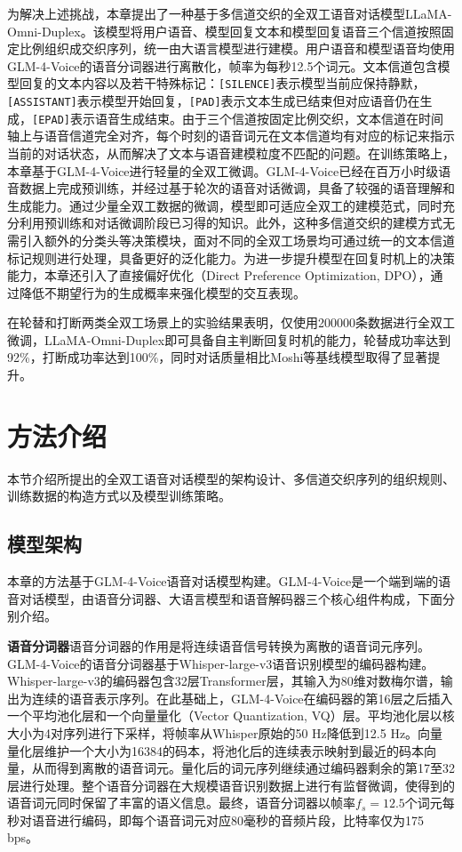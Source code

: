 为解决上述挑战，本章提出了一种基于多信道交织的全双工语音对话模型LLaMA-Omni-Duplex。该模型将用户语音、模型回复文本和模型回复语音三个信道按照固定比例组织成交织序列，统一由大语言模型进行建模。用户语音和模型语音均使用GLM-4-Voice\citep{glm4voice}的语音分词器进行离散化，帧率为每秒12.5个词元。文本信道包含模型回复的文本内容以及若干特殊标记：\texttt{[SILENCE]}表示模型当前应保持静默，\texttt{[ASSISTANT]}表示模型开始回复，\texttt{[PAD]}表示文本生成已结束但对应语音仍在生成，\texttt{[EPAD]}表示语音生成结束。由于三个信道按固定比例交织，文本信道在时间轴上与语音信道完全对齐，每个时刻的语音词元在文本信道均有对应的标记来指示当前的对话状态，从而解决了文本与语音建模粒度不匹配的问题。在训练策略上，本章基于GLM-4-Voice进行轻量的全双工微调。GLM-4-Voice已经在百万小时级语音数据上完成预训练，并经过基于轮次的语音对话微调，具备了较强的语音理解和生成能力。通过少量全双工数据的微调，模型即可适应全双工的建模范式，同时充分利用预训练和对话微调阶段已习得的知识。此外，这种多信道交织的建模方式无需引入额外的分类头等决策模块，面对不同的全双工场景均可通过统一的文本信道标记规则进行处理，具备更好的泛化能力。为进一步提升模型在回复时机上的决策能力，本章还引入了直接偏好优化（Direct Preference Optimization, DPO）\citep{rafailov2023dpo}，通过降低不期望行为的生成概率来强化模型的交互表现。

在轮替和打断两类全双工场景上的实验结果表明，仅使用200000条数据进行全双工微调，LLaMA-Omni-Duplex即可具备自主判断回复时机的能力，轮替成功率达到92\%，打断成功率达到100\%，同时对话质量相比Moshi\citep{kyutai2024moshi}等基线模型取得了显著提升。


\section{方法介绍}

本节介绍所提出的全双工语音对话模型的架构设计、多信道交织序列的组织规则、训练数据的构造方式以及模型训练策略。

\subsection{模型架构}

本章的方法基于GLM-4-Voice\citep{glm4voice}语音对话模型构建。GLM-4-Voice是一个端到端的语音对话模型，由语音分词器、大语言模型和语音解码器三个核心组件构成，下面分别介绍。

\textbf{语音分词器}\quad 语音分词器的作用是将连续语音信号转换为离散的语音词元序列。GLM-4-Voice的语音分词器基于Whisper-large-v3\citep{whisper}语音识别模型的编码器构建。Whisper-large-v3的编码器包含32层Transformer层，其输入为80维对数梅尔谱，输出为连续的语音表示序列。在此基础上，GLM-4-Voice在编码器的第16层之后插入一个平均池化层和一个向量量化（Vector Quantization, VQ）层。平均池化层以核大小为4对序列进行下采样，将帧率从Whisper原始的50 Hz降低到12.5 Hz。向量量化层维护一个大小为16384的码本，将池化后的连续表示映射到最近的码本向量，从而得到离散的语音词元。量化后的词元序列继续通过编码器剩余的第17至32层进行处理。整个语音分词器在大规模语音识别数据上进行有监督微调，使得到的语音词元同时保留了丰富的语义信息。最终，语音分词器以帧率$f_s = 12.5$个词元每秒对语音进行编码，即每个语音词元对应80毫秒的音频片段，比特率仅为175 bps。

